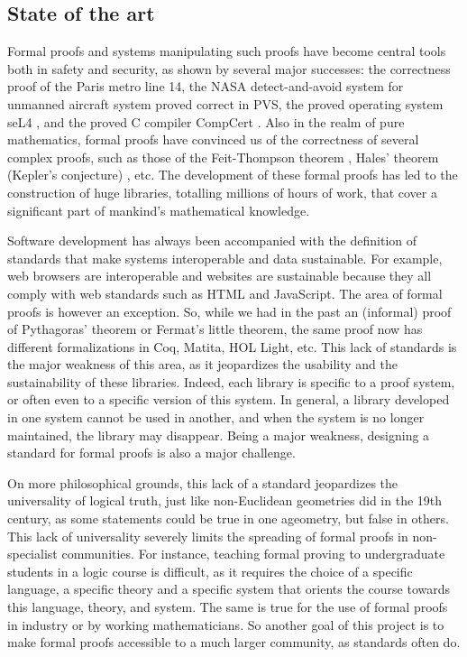 \subsection{State of the art}

Formal proofs and systems manipulating such proofs have become central
tools both in safety and security, as shown by several major
successes: the correctness proof of the Paris metro line 14, the NASA
detect-and-avoid system for unmanned aircraft system proved correct in
PVS, the proved operating system seL4 \cite{Klein09}, and the proved C
compiler CompCert \cite{Leroy06}.  Also in the realm of pure
mathematics, formal proofs have convinced us of the correctness of
several complex proofs, such as those of the Feit-Thompson theorem
\cite{Gonthier13}, Hales' theorem (Kepler's conjecture)
\cite{Hales17}, etc.  The development of these formal proofs has led
to the construction of huge libraries, totalling millions of hours of
work, that cover a significant part of mankind's mathematical
knowledge.

Software development has always been accompanied with the definition
of standards that make systems interoperable and data sustainable. For
example, web browsers are interoperable and websites are sustainable
because they all comply with web standards such as HTML and
JavaScript. The area of formal proofs is however an exception. So,
while we had in the past an (informal) proof of Pythagoras' theorem or
Fermat's little theorem, the same proof now has different
formalizations in {\sc Coq}, {\sc Matita}, {\sc HOL Light}, etc. This
lack of standards is the major weakness of this area, as it
jeopardizes the usability and the sustainability of these
libraries. Indeed, each library is specific to a proof system, or
often even to a specific version of this system. In general, a library
developed in one system cannot be used in another, and when the system
is no longer maintained, the library may disappear. Being a major
weakness, designing a standard for formal proofs is also a major
challenge.

On more philosophical grounds, this lack of a standard jeopardizes the
universality of logical truth, just like non-Euclidean geometries did
in the 19th century, as some statements could be true in one
ageometry, but false in others.  This lack of universality severely
limits the spreading of formal proofs in non-specialist
communities. For instance, teaching formal proving to undergraduate
students in a logic course is difficult, as it requires the choice of
a specific language, a specific theory and a specific system that
orients the course towards this language, theory, and system. The same
is true for the use of formal proofs in industry or by working
mathematicians. So another goal of this project is to make formal
proofs accessible to a much larger community, as standards often do.

